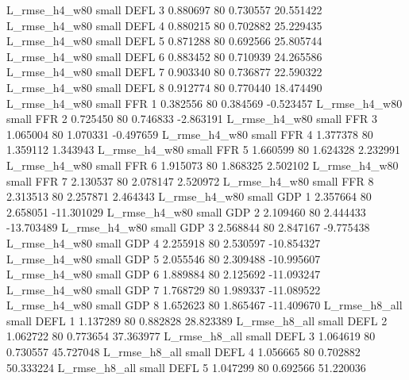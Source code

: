  L_rmse_h4_w80      small     DEFL                 3 0.880697 80       0.730557          20.551422
 L_rmse_h4_w80      small     DEFL                 4 0.880215 80       0.702882          25.229435
 L_rmse_h4_w80      small     DEFL                 5 0.871288 80       0.692566          25.805744
 L_rmse_h4_w80      small     DEFL                 6 0.883452 80       0.710939          24.265586
 L_rmse_h4_w80      small     DEFL                 7 0.903340 80       0.736877          22.590322
 L_rmse_h4_w80      small     DEFL                 8 0.912774 80       0.770440          18.474490
 L_rmse_h4_w80      small      FFR                 1 0.382556 80       0.384569          -0.523457
 L_rmse_h4_w80      small      FFR                 2 0.725450 80       0.746833          -2.863191
 L_rmse_h4_w80      small      FFR                 3 1.065004 80       1.070331          -0.497659
 L_rmse_h4_w80      small      FFR                 4 1.377378 80       1.359112           1.343943
 L_rmse_h4_w80      small      FFR                 5 1.660599 80       1.624328           2.232991
 L_rmse_h4_w80      small      FFR                 6 1.915073 80       1.868325           2.502102
 L_rmse_h4_w80      small      FFR                 7 2.130537 80       2.078147           2.520972
 L_rmse_h4_w80      small      FFR                 8 2.313513 80       2.257871           2.464343
 L_rmse_h4_w80      small      GDP                 1 2.357664 80       2.658051         -11.301029
 L_rmse_h4_w80      small      GDP                 2 2.109460 80       2.444433         -13.703489
 L_rmse_h4_w80      small      GDP                 3 2.568844 80       2.847167          -9.775438
 L_rmse_h4_w80      small      GDP                 4 2.255918 80       2.530597         -10.854327
 L_rmse_h4_w80      small      GDP                 5 2.055546 80       2.309488         -10.995607
 L_rmse_h4_w80      small      GDP                 6 1.889884 80       2.125692         -11.093247
 L_rmse_h4_w80      small      GDP                 7 1.768729 80       1.989337         -11.089522
 L_rmse_h4_w80      small      GDP                 8 1.652623 80       1.865467         -11.409670
 L_rmse_h8_all      small     DEFL                 1 1.137289 80       0.882828          28.823389
 L_rmse_h8_all      small     DEFL                 2 1.062722 80       0.773654          37.363977
 L_rmse_h8_all      small     DEFL                 3 1.064619 80       0.730557          45.727048
 L_rmse_h8_all      small     DEFL                 4 1.056665 80       0.702882          50.333224
 L_rmse_h8_all      small     DEFL                 5 1.047299 80       0.692566          51.220036
